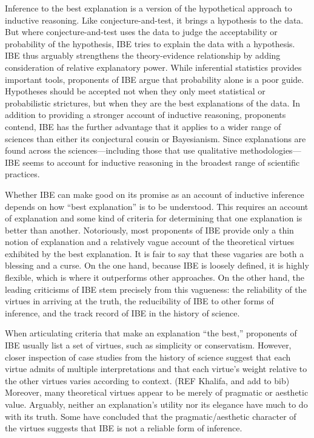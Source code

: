 \documentclass{article}[11pt]
\begin{document}
Inference to the best explanation is a version of the hypothetical approach to inductive reasoning.  Like conjecture-and-test, it brings a hypothesis to the data.  But where conjecture-and-test uses the data to judge the acceptability or probability of the hypothesis, IBE tries to explain the data with a hypothesis.  IBE thus arguably strengthens the theory-evidence relationship by adding consideration of relative explanatory power.  While inferential statistics provides important tools, proponents of IBE argue that probability alone is a poor guide.  Hypotheses should be accepted not when they only meet statistical or probabilistic strictures, but when they are the best explanations of the data. In addition to providing a stronger account of inductive reasoning, proponents contend, IBE has the further advantage that it applies to a wider range of sciences than either its conjectural cousin or Bayesianism.  Since explanations are found across the sciences---including those that use qualitative methodologies---IBE seems to account for inductive reasoning in the broadest range of scientific practices.

Whether IBE can make good on its promise as an account of inductive inference depends on how ``best explanation'' is to be understood.  This requires an account of explanation and some kind of criteria for determining that one explanation is better than another.  Notoriously, most proponents of IBE provide only a thin notion of explanation and a relatively vague account of the theoretical virtues exhibited by the best explanation.  It is fair to say that these vagaries are both a blessing and a curse. On the one hand, because IBE is loosely defined, it is highly flexible, which is  where it outperforms other approaches. On the other hand, the leading criticisms of IBE stem precisely from this vagueness: the reliability of the virtues in arriving at the truth, the reducibility of IBE to other forms of inference, and the track record of IBE in the history of science.

When articulating criteria that make an explanation ``the best,'' proponents of IBE usually list a set of virtues, such as simplicity or conservatism. However, closer inspection of case studies from the history of science suggest that each virtue admits of multiple interpretations and that each virtue's weight relative to the other virtues varies according to context. (REF Khalifa, and add to bib) Moreover, many theoretical virtues appear to be merely of pragmatic or aesthetic value. Arguably, neither an explanation’s utility nor its elegance have much to do with its truth. Some have concluded that the pragmatic/aesthetic character of the virtues suggests that IBE is not a reliable form of inference.
\end{document}
